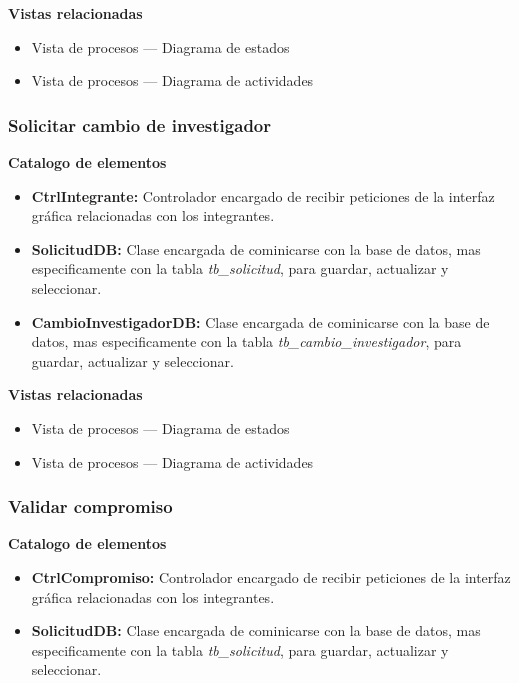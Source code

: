 \documentclass[12pt,oneside,letterpaper]{report}
\begin{document}
\textbf{Vistas relacionadas}
\begin{itemize}
 \item Vista de procesos --- Diagrama de estados
 \item Vista de procesos --- Diagrama de actividades
\end{itemize}

\subsubsection{Solicitar cambio de investigador}


\textbf{Catalogo de elementos}

\begin{itemize}
 \item \textbf{CtrlIntegrante:} Controlador encargado de recibir peticiones de la interfaz gráfica relacionadas con los integrantes.
 \item \textbf{SolicitudDB:} Clase encargada de cominicarse con la base de datos, mas especificamente con la tabla \textit{tb\_solicitud}, para guardar, actualizar y seleccionar.
 \item \textbf{CambioInvestigadorDB:} Clase encargada de cominicarse con la base de datos, mas especificamente con la tabla \textit{tb\_cambio\_investigador}, para guardar, actualizar y seleccionar.
\end{itemize}

\textbf{Vistas relacionadas}
\begin{itemize}
 \item Vista de procesos --- Diagrama de estados
 \item Vista de procesos --- Diagrama de actividades
\end{itemize}


\subsubsection{Validar compromiso}


\textbf{Catalogo de elementos}
\begin{itemize}
 \item \textbf{CtrlCompromiso:} Controlador encargado de recibir peticiones de la interfaz gráfica relacionadas con los integrantes.
 \item \textbf{SolicitudDB:} Clase encargada de cominicarse con la base de datos, mas especificamente con la tabla \textit{tb\_solicitud}, para guardar, actualizar y seleccionar.
\end{itemize}
\end{document}
